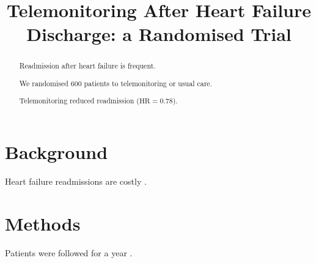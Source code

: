 \documentclass[twocolumn]{bmcart}
\newcommand{\HR}{\mathrm{HR}}
\begin{document}
\begin{frontmatter}

\begin{fmbox}

\title{Telemonitoring After Heart Failure Discharge: a Randomised Trial}

\author[
  addressref={aff1,aff2},
  corref={aff1},
  email={k.osei@ug.edu.gh}
]{ }
\author[
  addressref={aff2},
  email={l.moreau@chu-lyon.fr}
]{ }

\address[id=aff1]{
  ,
  ,
  ,
}
\address[id=aff2]{
  ,
  ,
  ,
}

\end{fmbox}

\begin{abstractbox}

\begin{abstract}
Readmission after heart failure is frequent.

We randomised 600 patients to telemonitoring or usual care.

Telemonitoring reduced readmission ($\HR = 0.78$).
\end{abstract}

\begin{keyword}
\end{keyword}

\end{abstractbox}

\end{frontmatter}

\section*{Background}

Heart failure readmissions are costly \cite{knuth}.

\section*{Methods}

Patients were followed for a year \cite{lamport}.
\end{document}
